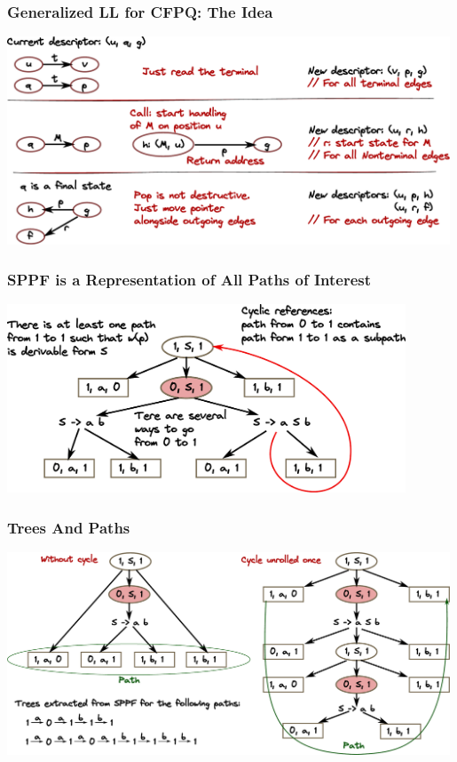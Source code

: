 \documentclass[xcolor=table,aspectratio=169]{beamer}
\begin{document}
\begin{frame}[fragile] \frametitle{Generalized LL for CFPQ: The Idea}
  \begin{center}
      \includegraphics[width=0.99\textwidth]{pictures/gll.pdf}
  \end{center}
\end{frame}

\begin{frame}[fragile] \frametitle{SPPF is a Representation of All Paths of Interest}
  \begin{center}
      \includegraphics[width=0.89\textwidth]{pictures/sppf.pdf}
  \end{center}
\end{frame}


\begin{frame}[fragile] \frametitle{Trees And Paths}
  \begin{center}
      \includegraphics[width=0.99\textwidth]{pictures/Trees.pdf}
  \end{center}
\end{frame}
\end{document}
